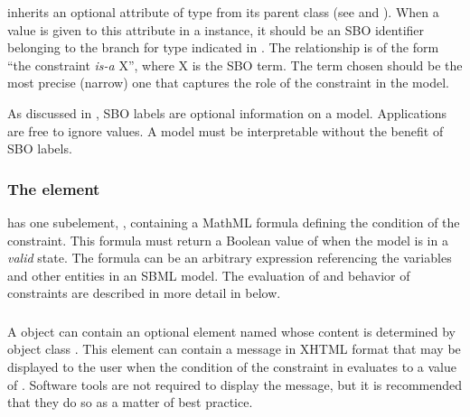 \Constraint inherits an optional 
attribute of type  from its parent
class \SBase (see 
and ).  When a value is given to this
attribute in a  \Constraint instance, it should be an
SBO identifier belonging to the branch for type  \Constraint
indicated in .  The relationship is
of the form ``the constraint \emph{is-a} X'', where X is
the SBO term.  The term chosen should be the most precise (narrow)
one that captures the role of the constraint in the model.

As discussed in , SBO labels are optional
information on a model.  Applications are free to ignore
 values.  A model must be interpretable without the
benefit of SBO labels.


\vspace*{-0.5ex}
\subsubsection{The  element}

\Constraint has one subelement, ,
containing a MathML formula defining the condition of the
constraint.  This formula must return a Boolean value of
 when the model is in a \emph{valid} state.  The formula
can be an arbitrary expression referencing the variables and other
entities in an SBML model.  The evaluation of  and
behavior of constraints are described in more detail in
 below.


\subsubsection{}
\label{sec:constraint-message}

A \Constraint object can contain an optional element named
 whose content is determined by object class \Message.
This element can contain a message in XHTML format that may be
displayed to the user when the condition of the constraint in
 evaluates to a value of .  Software tools
are not required to display the message, but it is recommended
that they do so as a matter of best practice.

